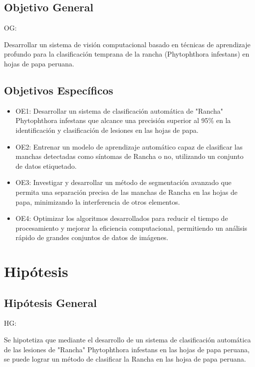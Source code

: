 \subsection{Objetivo General}
OG: \newcommand{\ObjetivoGeneral}{
	Desarrollar un sistema de visión computacional basado en técnicas de aprendizaje profundo para la clasificación temprana de la rancha (Phytophthora infestans) en hojas de papa peruana.
}
\ObjetivoGeneral

\subsection{Objetivos Específicos}
\newcommand{\Objone}{
Desarrollar un sistema de clasificación automática de "Rancha" Phytophthora infestans que alcance una precisión superior al 95\% en la identificación y clasificación de lesiones en las hojas de papa.
}

\newcommand{\Objtwo}{
Entrenar un modelo de aprendizaje automático capaz de clasificar las manchas detectadas como síntomas de Rancha o no, utilizando un conjunto de datos etiquetado.
}

\newcommand{\Objthree}{
Investigar y desarrollar un método de segmentación avanzado que permita una separación precisa de las manchas de Rancha en las hojas de papa, minimizando la interferencia de otros elementos.
}

\newcommand{\Objfour}{
Optimizar los algoritmos desarrollados para reducir el tiempo de procesamiento y mejorar la eficiencia computacional, permitiendo un análisis rápido de grandes conjuntos de datos de imágenes.
}

\begin{itemize}
	\item OE1: {\Objone}
	\item OE2: {\Objtwo}
	\item OE3: {\Objthree}
	\item OE4: {\Objfour}
\end{itemize}

\section{Hipótesis}

\subsection{Hipótesis General}
HG: \newcommand{\HipotesisGeneral}{
Se hipotetiza que mediante el desarrollo de un sistema de clasificación automática de las lesiones de "Rancha" Phytophthora infestans en las hojas de papa peruana, se puede lograr un método de clasificar la Rancha en las hojsa de papa peruana.
}
\HipotesisGeneral
